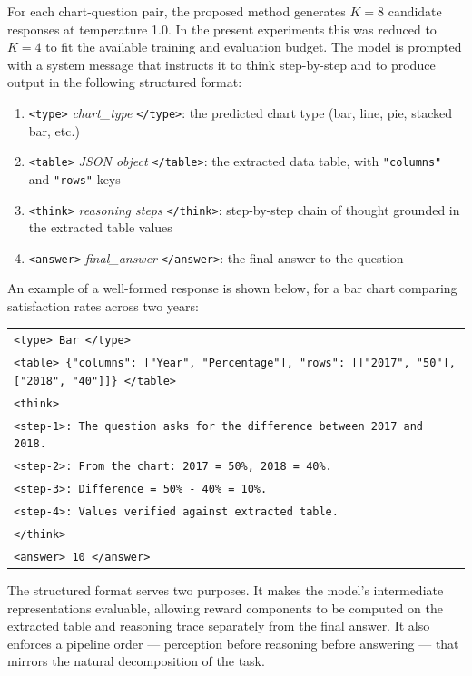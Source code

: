 \documentclass{iutbscthesis}
\begin{document}
For each chart-question pair, the proposed method generates $K = 8$ candidate responses at temperature 1.0. In the present experiments this was reduced to $K = 4$ to fit the available training and evaluation budget. The model is prompted with a system message that instructs it to think step-by-step and to produce output in the following structured format:

\begin{enumerate}
    \item \texttt{<type>} \textit{chart\_type} \texttt{</type>}: the predicted chart type (bar, line, pie, stacked bar, etc.)
    \item \texttt{<table>} \textit{JSON object} \texttt{</table>}: the extracted data table, with \texttt{"columns"} and \texttt{"rows"} keys
    \item \texttt{<think>} \textit{reasoning steps} \texttt{</think>}: step-by-step chain of thought grounded in the extracted table values
    \item \texttt{<answer>} \textit{final\_answer} \texttt{</answer>}: the final answer to the question
\end{enumerate}

An example of a well-formed response is shown below, for a bar chart comparing satisfaction rates across two years:

\smallskip
\begin{center}
\begin{tabular}{l}
\hline
\texttt{<type> Bar </type>} \\
\texttt{<table> \{"columns": ["Year", "Percentage"], "rows": [["2017", "50"], ["2018", "40"]]\} </table>} \\
\texttt{<think>} \\
\quad \texttt{<step-1>: The question asks for the difference between 2017 and 2018.} \\
\quad \texttt{<step-2>: From the chart: 2017 = 50\%, 2018 = 40\%.} \\
\quad \texttt{<step-3>: Difference = 50\% - 40\% = 10\%.} \\
\quad \texttt{<step-4>: Values verified against extracted table.} \\
\texttt{</think>} \\
\texttt{<answer> 10 </answer>} \\
\hline
\end{tabular}
\end{center}
\smallskip

The structured format serves two purposes. It makes the model's intermediate representations evaluable, allowing reward components to be computed on the extracted table and reasoning trace separately from the final answer. It also enforces a pipeline order --- perception before reasoning before answering --- that mirrors the natural decomposition of the task.
\end{document}
